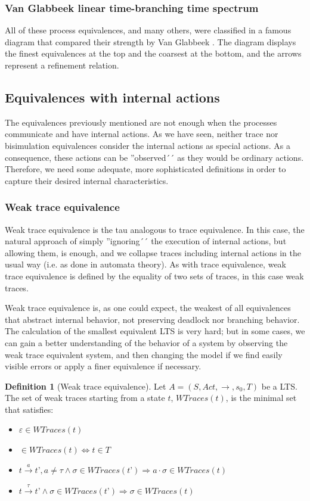\documentclass[11pt]{article}
\theoremstyle{definition}
\newtheorem{definition}{Definition}
\newcommand{\cmark}{\ding{51}}
\theoremstyle{plain}
\theoremstyle{definition}
\begin{document}
\subsubsection{Van Glabbeek linear time-branching time spectrum}

All of these process equivalences, and many others, were classified in a famous diagram that compared their strength by Van Glabbeek \cite{van1990linear}. The diagram displays the finest equivalences at the top and the coarsest at the bottom, and the arrows represent a refinement relation.

\subsection{Equivalences with internal actions}
The equivalences previously mentioned are not enough when the processes communicate and have internal actions. As we have seen, neither trace nor bisimulation equivalences consider the internal actions as special actions. As a consequence, these actions can be ''observed´´ as they would be ordinary actions. Therefore, we need some adequate, more sophisticated definitions in order to capture their desired internal characteristics.

\subsubsection{Weak trace equivalence}

Weak trace equivalence is the tau analogous to trace equivalence. In this case, the natural approach of simply ''ignoring´´ the execution of internal actions, but allowing them, is enough, and we collapse traces including internal actions in the usual way (i.e. as done in automata theory). As with trace equivalence, weak trace equivalence is defined by the equality of two sets of traces, in this case weak traces.

Weak trace equivalence is, as one could expect, the weakest of all equivalences that abstract internal behavior, not preserving deadlock nor branching behavior. The calculation of the smallest equivalent LTS is very hard; but in some cases, we can gain a better understanding of the behavior of a system by observing the weak trace equivalent system, and then changing the model if we find easily visible errors or apply a finer equivalence if necessary.

\begin{definition} [Weak trace equivalence]
	Let $ A = (S, Act, \rightarrow, s_0, T) $ be a LTS. The set of weak traces starting from a state $ t $, $ WTraces(t) $, is the minimal set that satisfies:
	\begin{itemize}
		\item $ \varepsilon \in WTraces(t) $
		\item \cmark $ \in WTraces(t) \iff t \in T $
		\item $ t\xrightarrow{a}t’, a\not = \tau \wedge \sigma \in WTraces(t’) \Rightarrow a\cdot\sigma \in WTraces(t) $
		\item $ t\xrightarrow{\tau}t’ \wedge \sigma \in WTraces(t’) \Rightarrow \sigma \in WTraces(t) $
	\end{itemize}
\end{definition}
\end{document}
